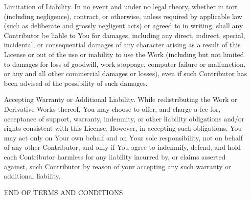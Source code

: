 \documentclass{article}
\begin{document}
  Limitation of Liability. In no event and under no legal theory,
  whether in tort (including negligence), contract, or otherwise,
  unless required by applicable law (such as deliberate and grossly
  negligent acts) or agreed to in writing, shall any Contributor be
  liable to You for damages, including any direct, indirect, special,
  incidental, or consequential damages of any character arising as a
  result of this License or out of the use or inability to use the
  Work (including but not limited to damages for loss of goodwill,
  work stoppage, computer failure or malfunction, or any and all
  other commercial damages or losses), even if such Contributor has
  been advised of the possibility of such damages.

  Accepting Warranty or Additional Liability. While redistributing
  the Work or Derivative Works thereof, You may choose to offer, and
  charge a fee for, acceptance of support, warranty, indemnity, or
  other liability obligations and/or rights consistent with this
  License. However, in accepting such obligations, You may act only
  on Your own behalf and on Your sole responsibility, not on behalf
  of any other Contributor, and only if You agree to indemnify,
  defend, and hold each Contributor harmless for any liability
  incurred by, or claims asserted against, such Contributor by reason
  of your accepting any such warranty or additional liability.

END OF TERMS AND CONDITIONS
\end{document}
